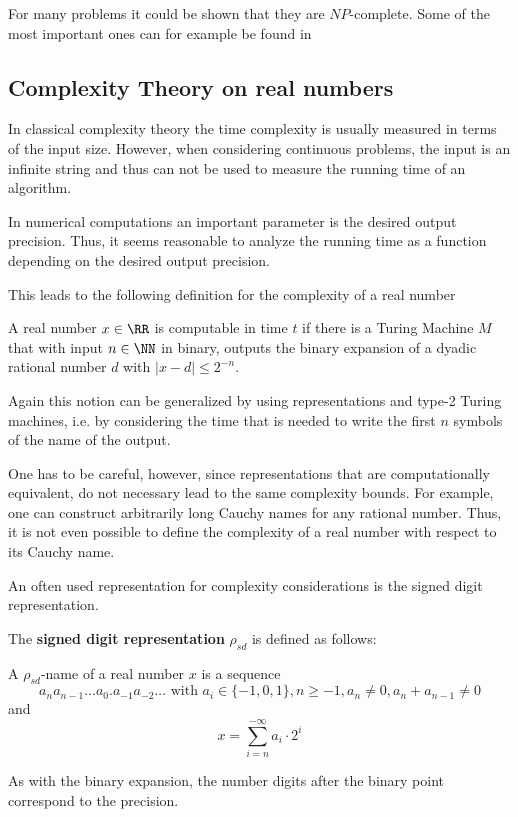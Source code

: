     For many problems it could be shown that they are $NP$-complete. 
    Some of the most important ones can for example be found in
    \cite{garey1979}
	\subsection{Complexity Theory on real numbers}
		In classical complexity theory the time complexity is usually measured in terms of the input size.
		However, when considering continuous problems, the input is an infinite string and thus can not 
		be used to measure the running time of an algorithm.

		In numerical computations an important parameter is the desired output precision.
		Thus, it seems reasonable to analyze the running time as a function depending on the desired output precision.
    
		This leads to the following definition for the complexity of a real
    number
		\begin{definition}\label{def:complexity_real_number}
			A real number $x \in \RR$ is computable in time $t$ if there is a Turing Machine $M$ that with input $n \in \NN$ in binary, 
			outputs the binary expansion of a dyadic rational number $d$ with $| x - d | \leq 2^{-n}$.  
		\end{definition}
		Again this notion can be generalized by using representations and type-2
    Turing machines, i.e. by considering the time that is needed to write the first $n$ symbols
		of the name of the output.
      
    One has to be careful, however, since representations that are
    computationally equivalent, do not necessary lead to the same complexity
    bounds.  
    For example, one can construct arbitrarily long Cauchy names for
    any rational number.
    Thus, it is not even possible to define the complexity of a real number
    with respect to its Cauchy name.

		An often used representation for complexity considerations is the signed
    digit representation.
		\begin{definition}
			The \textbf{signed digit representation} $\rho_{sd}$ is defined as follows: 

      A $\rho_{sd}$-name of a real number $x$ is a sequence 
			$$a_n a_{n-1} \dots a_0 . a_{-1} a_{-2} \dots \text{ with } a_i \in \{-1,0,1\}, n \geq -1, a_n \neq 0, a_n + a_{n-1} \neq 0$$
      and
			$$  x = \sum_{i=n}^{-\infty} a_i \cdot 2^i $$  
		\end{definition}
		As with the binary expansion, the number digits after the binary point correspond to the precision.

